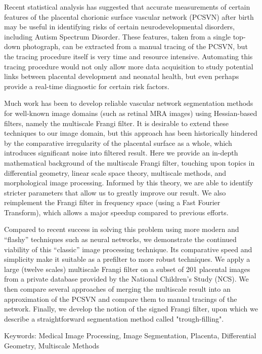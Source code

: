 

Recent statistical analysis has suggested that accurate measurements of certain features of the placental chorionic surface vascular network (PCSVN) after birth may be useful in identifying risks of certain neurodevelopmental disorders, including Autism Spectrum Disorder. These features, taken from a single top-down photograph, can be extracted from a manual tracing of the PCSVN, but the tracing procedure itself is very time and resource intensive. Automating this tracing procedure would not only allow more data acquisition to study potential links between placental development and neonatal health, but even perhaps provide a real-time diagnostic for certain risk factors.

Much work has been to develop reliable vascular network segmentation methods for well-known image domains (such as retinal MRA images) using Hessian-based filters, namely the multiscale Frangi filter. It is desirable to extend these techniques to our image domain, but this approach has been historically hindered by the comparative irregularity of the placental surface as a whole, which introduces significant noise into filtered result. Here we provide an in-depth mathematical background of the multiscale Frangi filter, touching upon topics in differential geometry, linear scale space theory, multiscale methods, and morphological image processing. Informed by this theory, we are able to identify stricter parameters that allow us to greatly improve our result. We also reimplement the Frangi filter in frequency space (using a Fast Fourier Transform), which allows a major speedup compared to previous efforts.

Compared to recent success in solving this problem using more modern and ``flashy'' techniques such as neural networks, we demonstrate the continued viability of this ``classic'' image processing technique. Its comparative speed and simplicity make it suitable as a prefilter to more robust techniques. We apply a large (twelve scales) multiscale Frangi filter on a subset of 201 placental images from a private database provided by the National Children's Study (NCS). We then compare several approaches of merging the multiscale result into an approximation of the PCSVN and compare them to manual tracings of the network. Finally, we develop the notion of the signed Frangi filter, upon which we describe a straightforward segmentation method called "trough-filling".

Keywords: Medical Image Processing, Image Segmentation, Placenta, Differential Geometry, Multiscale Methods



